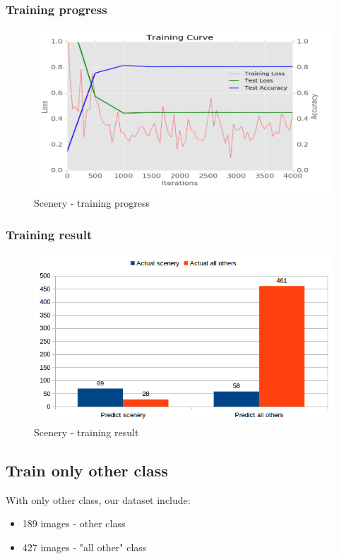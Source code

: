 \documentclass[11pt]{article}
\begin{document}
\subsubsection{Training progress}

\begin{figure}[H]
\centering
\includegraphics[width=1\textwidth]{images/train_only_scenery}
\caption{Scenery - training progress}
\end{figure}

\subsubsection{Training result}

\begin{figure}[H]
\centering
\includegraphics[width=1\textwidth]{images/scenery}
\caption{Scenery - training result}
\end{figure}

\subsection{Train only other class}
With only other class, our dataset include: 
\begin{itemize}
\item 189 images - other class
\item 427 images - "all other" class
\end{itemize}
\end{document}
